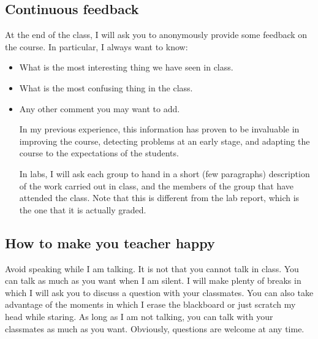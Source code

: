 \subsection{Continuous feedback}
At the end of the class, I will ask you to anonymously provide some feedback on the course. 
In particular, I always want to know:
\begin{itemize}
\item What is the most interesting thing we have seen in class.
\item What is the most confusing thing in the class.
\item Any other comment you may want to add.

In my previous experience, this information has proven to be invaluable in improving the course, detecting problems at an early stage, and adapting the course to the expectations of the students.

In labs, I will ask each group to hand in a short (few paragraphs) description of the work carried out in class, and the members of the group that have attended the class.
Note that this is different from the lab report, which is the one that it is actually graded.
\end{itemize}

\subsection{How to make you teacher happy}

Avoid speaking while I am talking.
It is not that you cannot talk in class.
You can talk as much as you want when I am silent.
I will make plenty of breaks in which I will ask you to discuss a question with your classmates.
You can also take advantage of the moments in which I erase the blackboard or just scratch my head while staring.
As long as I am not talking, you can talk with your classmates as much as you want.
Obviously, questions are welcome at any time.
